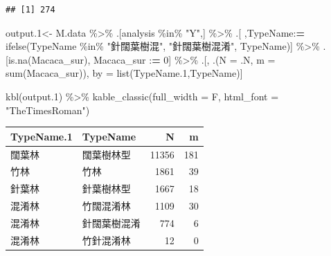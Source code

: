 \documentclass[
]{article}
\newenvironment{Shaded}{\begin{snugshade}}{\end{snugshade}}
\newcommand{\AttributeTok}[1]{\textcolor[rgb]{0.77,0.63,0.00}{#1}}
\newcommand{\DecValTok}[1]{\textcolor[rgb]{0.00,0.00,0.81}{#1}}
\newcommand{\ErrorTok}[1]{\textcolor[rgb]{0.64,0.00,0.00}{\textbf{#1}}}
\newcommand{\FloatTok}[1]{\textcolor[rgb]{0.00,0.00,0.81}{#1}}
\newcommand{\FunctionTok}[1]{\textcolor[rgb]{0.00,0.00,0.00}{#1}}
\newcommand{\NormalTok}[1]{#1}
\newcommand{\OtherTok}[1]{\textcolor[rgb]{0.56,0.35,0.01}{#1}}
\newcommand{\SpecialCharTok}[1]{\textcolor[rgb]{0.00,0.00,0.00}{#1}}
\newcommand{\StringTok}[1]{\textcolor[rgb]{0.31,0.60,0.02}{#1}}
\begin{document}
\begin{verbatim}
## [1] 274
\end{verbatim}

\begin{Shaded}
\begin{Highlighting}[]
\NormalTok{output}\FloatTok{.1}\OtherTok{\textless{}{-}}\NormalTok{ M.data }\SpecialCharTok{\%\textgreater{}\%} 
\NormalTok{   .[analysis }\SpecialCharTok{\%in\%} \StringTok{"Y"}\NormalTok{,] }\SpecialCharTok{\%\textgreater{}\%} 
\NormalTok{   .[ ,TypeName}\SpecialCharTok{:}\ErrorTok{=} \FunctionTok{ifelse}\NormalTok{(TypeName }\SpecialCharTok{\%in\%} \StringTok{"針闊葉樹混"}\NormalTok{,}
                        \StringTok{"針闊葉樹混淆"}\NormalTok{,}
\NormalTok{                        TypeName)] }\SpecialCharTok{\%\textgreater{}\%} 
\NormalTok{   .[}\FunctionTok{is.na}\NormalTok{(Macaca\_sur), Macaca\_sur }\SpecialCharTok{:}\ErrorTok{=} \DecValTok{0}\NormalTok{] }\SpecialCharTok{\%\textgreater{}\%}
\NormalTok{   .[, .(}\AttributeTok{N =}\NormalTok{ .N, }\AttributeTok{m =} \FunctionTok{sum}\NormalTok{(Macaca\_sur)), by }\OtherTok{=} \FunctionTok{list}\NormalTok{(TypeName}\FloatTok{.1}\NormalTok{,TypeName)]}


  \FunctionTok{kbl}\NormalTok{(output}\FloatTok{.1}\NormalTok{) }\SpecialCharTok{\%\textgreater{}\%} 
  \FunctionTok{kable\_classic}\NormalTok{(}\AttributeTok{full\_width =}\NormalTok{ F, }\AttributeTok{html\_font =} \StringTok{"TheTimesRoman"}\NormalTok{)}
\end{Highlighting}
\end{Shaded}

\begin{table}[H]
\centering
\begin{tabular}[t]{l|l|r|r}
\hline
TypeName.1 & TypeName & N & m\\
\hline
闊葉林 & 闊葉樹林型 & 11356 & 181\\
\hline
竹林 & 竹林 & 1861 & 39\\
\hline
針葉林 & 針葉樹林型 & 1667 & 18\\
\hline
混淆林 & 竹闊混淆林 & 1109 & 30\\
\hline
混淆林 & 針闊葉樹混淆 & 774 & 6\\
\hline
混淆林 & 竹針混淆林 & 12 & 0\\
\hline
\end{tabular}
\end{table}
\end{document}
